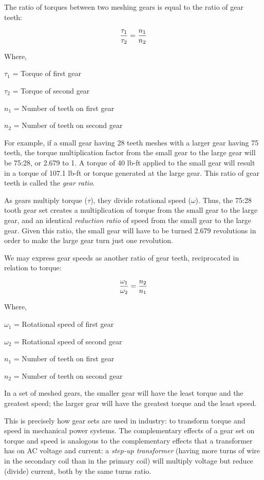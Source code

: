 The ratio of torques between two meshing gears is equal to the ratio of gear teeth:

$${\tau_1 \over \tau_2} = {n_1 \over n_2}$$

\noindent
Where,

$\tau_1$ = Torque of first gear

$\tau_2$ = Torque of second gear

$n_1$ = Number of teeth on first gear

$n_2$ = Number of teeth on second gear

\vskip 10pt

\filbreak

For example, if a small gear having 28 teeth meshes with a larger gear having 75 teeth, the torque multiplication factor from the small gear to the large gear will be 75:28, or 2.679 to 1.  A torque of 40 lb-ft applied to the small gear will result in a torque of 107.1 lb-ft or torque generated at the large gear.  This ratio of gear teeth is called the \textit{gear ratio}.  

As gears multiply torque ($\tau$), they divide rotational speed ($\omega$).  Thus, the 75:28 tooth gear set creates a multiplication of torque from the small gear to the large gear, and an identical \textit{reduction ratio} of speed from the small gear to the large gear.  Given this ratio, the small gear will have to be turned 2.679 revolutions in order to make the large gear turn just one revolution.

We may express gear speeds as another ratio of gear teeth, reciprocated in relation to torque:

$${\omega_1 \over \omega_2} = {n_2 \over n_1}$$

\noindent
Where,

$\omega_1$ = Rotational speed of first gear

$\omega_2$ = Rotational speed of second gear

$n_1$ = Number of teeth on first gear

$n_2$ = Number of teeth on second gear

\vskip 10pt

In a set of meshed gears, the smaller gear will have the least torque and the greatest speed; the larger gear will have the greatest torque and the least speed.

This is precisely how gear sets are used in industry: to transform torque and speed in mechanical power systems.  The complementary effects of a gear set on torque and speed is analogous to the complementary effects that a transformer has on AC voltage and current: a \textit{step-up transformer} (having more turns of wire in the secondary coil than in the primary coil) will multiply voltage but reduce (divide) current, both by the same turns ratio.  

